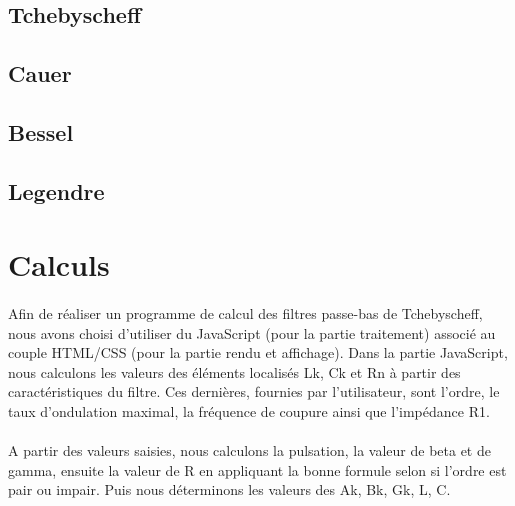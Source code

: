 \documentclass[a4paper,11pt]{article}
\begin{document}
    \subsection{Tchebyscheff}
        \paragraph{}

    \subsection{Cauer}
        \paragraph{}

    \subsection{Bessel}
        \paragraph{}

    \subsection{Legendre}
        \paragraph{}


    \clearpage


\section{Calculs}
    \paragraph{}
Afin de réaliser un programme de calcul des filtres passe-bas de Tchebyscheff, nous avons choisi d’utiliser du JavaScript (pour la partie traitement) associé au couple HTML/CSS (pour la partie rendu et affichage).
Dans la partie JavaScript, nous calculons les valeurs des éléments localisés Lk, Ck et Rn à partir des caractéristiques du filtre.
Ces dernières, fournies par l'utilisateur, sont l’ordre, le taux d’ondulation maximal, la fréquence de coupure ainsi que l’impédance R1.
    \paragraph{}
A partir des valeurs saisies, nous calculons la pulsation, la valeur de beta et de gamma, ensuite la valeur de R en appliquant la bonne formule selon si l’ordre est pair ou impair.
Puis nous déterminons les valeurs des Ak, Bk, Gk, L, C.
\end{document}
